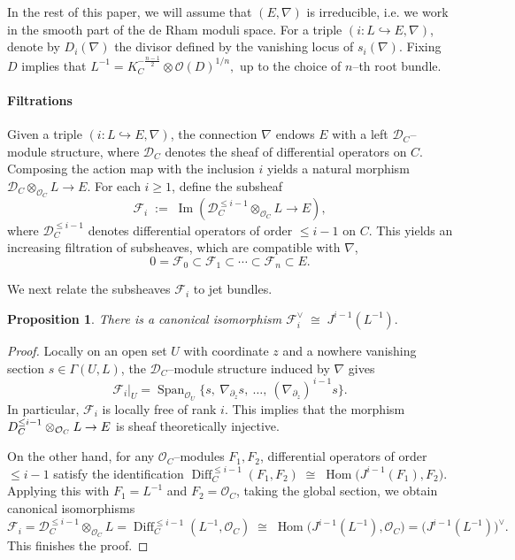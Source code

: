\documentclass[twoside, 11pt]{article}
\numberwithin{equation}{section}
\theoremstyle{theorem}
\numberwithin{theorem}{section}
\newtheorem{proposition}[proposition]{Proposition}
\theoremstyle{definition}
\begin{document}
In the rest of this paper, we will assume that $(E,\nabla)$ is irreducible,
i.e. we work in the smooth part of the de Rham moduli space.
For a triple 
\((i: L \hookrightarrow E, \nabla) \), denote by $D_i(\nabla)$ 
the divisor defined by the vanishing locus of $s_i(\nabla)$. 
Fixing $D$ implies that  
$
    L^{-1} = K_C^{-\frac{n-1}{2}} \otimes \mathcal{O}(D)^{1/n},
$
up to the choice of $n$--th root bundle.

\paragraph{Filtrations}
Given a triple $(i\colon L\hookrightarrow E,\nabla)$, the connection $\nabla$
endows $E$ with a left $\mathcal D_C$--module structure, where
$\mathcal D_C$ denotes the sheaf of differential operators on $C$.
Composing the action map with the inclusion $i$ yields a natural morphism
\(
\mathcal D_C\otimes_{\mathcal O_C} L \rightarrow E .
\)
For each $i\ge 1$, define the subsheaf
\begin{equation}\label{eq:def-Fi}
\mathcal F_i
\;:=\;
\operatorname{Im}\!\left(
\mathcal D_C^{\le i-1}\otimes_{\mathcal O_C} L \rightarrow E
\right),
\end{equation}
where $\mathcal D_C^{\le i-1}$ denotes differential operators of order
$\le i-1$ on $C$.
This yields an increasing filtration of subsheaves, which are compatible with $\nabla$,
\begin{equation}\label{eqn-sheaves-filtration}
0=\mathcal F_0\subset \mathcal F_1\subset \cdots \subset \mathcal F_n\subset E.
\end{equation}

We next relate the subsheaves $\mathcal F_i$ to jet bundles.
\begin{proposition}\label{p:oper bundle out D}
There is a canonical isomorphism 
\(
\mathcal F_i^\vee \;\cong\; J^{i-1}(L^{-1}).
\)
\end{proposition}

\begin{proof}
Locally on an open set $U$ with coordinate $z$ and a nowhere
vanishing section $s\in\Gamma(U,L)$, the $\mathcal D_C$--module structure
induced by $\nabla$ gives
\[
\mathcal F_i|_U
=
\operatorname{Span}_{\mathcal O_U}
\bigl\{
s,\ \nabla_{\partial_z}s,\ \ldots,\ (\nabla_{\partial_z})^{\,i-1}s
\bigr\}.
\]
In particular, $\mathcal F_i$ is locally free of rank $i$. This implies that the morphism $\mathcal \mathcal D_C^{\le i-1}\otimes_{\mathcal O_C} L \rightarrow E$ is sheaf theoretically injective.

On the other hand, for any $\mathcal O_C$--modules $F_1,F_2$, differential
operators of order $\le i-1$ satisfy the identification
\(
\operatorname{Diff}_C^{\le i-1}(F_1,F_2)
\;\cong\;
\operatorname{Hom}\!\bigl(J^{i-1}(F_1),F_2\bigr).
\)
Applying this with $F_1=L^{-1}$ and $F_2=\mathcal O_C$, taking the global section, we obtain canonical isomorphisms
\[
\mathcal F_i
= \mathcal D_C^{\le i-1}\otimes_{\mathcal O_C} L
=
\operatorname{Diff}_C^{\le i-1}(L^{-1},\mathcal O_C)
\;\cong\;
\operatorname{Hom}\bigl(J^{i-1}(L^{-1}),\mathcal O_C\bigr)
=
\bigl(J^{i-1}(L^{-1})\bigr)^\vee.
\]
This finishes the proof.
\end{proof}
\end{document}
